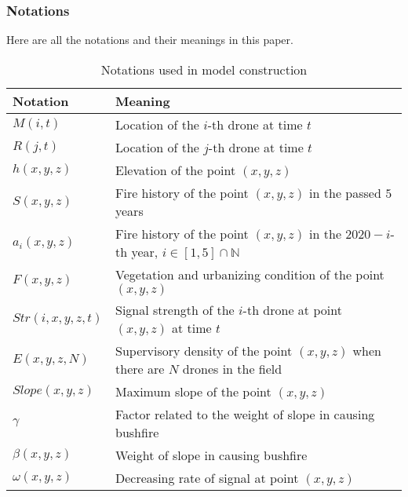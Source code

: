 \documentclass[13pt]{ctexart} %
\begin{document}
\subsubsection{Notations}
Here are all the notations and their meanings in this paper.
\begin{table}[h]
    \centering
    \caption{Notations used in model construction}
    \vspace{3pt}
    \begin{tabular}{>{\centering\arraybackslash}p{6em}>{\centering\arraybackslash}p{30em}}
        \toprule %
        Notation         & Meaning                                 \\
        \midrule %
        $M
        (i,t)$           & Location of the $i$-th drone
        \uppercase\expandafter{\romannumeral1} at time $t$         \\
        $R
        (j,t)$           & Location of the $j$-th drone
        \uppercase\expandafter{\romannumeral2} at time $t$         \\
        $h
        (x,y,z)$         & Elevation of the point $(x,y,z)$        \\
        $S
        (x,y,z)$         & Fire history of the point $(x,y,z)$
        in the passed $5$ years                                    \\
        $a_i
        (x,y,z)$         & Fire history of the point $(x,y,z)$
        in the $2020-i$-th year,
        $i\in [1,5] \cap \mathbb{N} $                              \\
        $F(x,y,z) $      & Vegetation and urbanizing
        condition of the point$(x,y,z)$                            \\
        $Str(i,x,y,z,t)$   & Signal strength of the
        $i$-th drone at point $(x,y,z)$ at time $t$                \\
        $E
        (x,y,z,N)$       & Supervisory density of
        the point $(x,y,z)$ when there are $N$ drones in the field \\
        $Slope
        (x,y,z)$         & Maximum slope of the point $(x,y,z)$    \\
        $\gamma$         & Factor related to the weight
        of slope in causing bushfire                               \\
        $\beta
        (x,y,z)$         & Weight of slope in causing bushfire     \\
        $\omega
        (x,y,z)$         & Decreasing rate of signal
        at point $(x,y,z)$                                         \\

\end{tabular}
\end{table}
\end{document}
